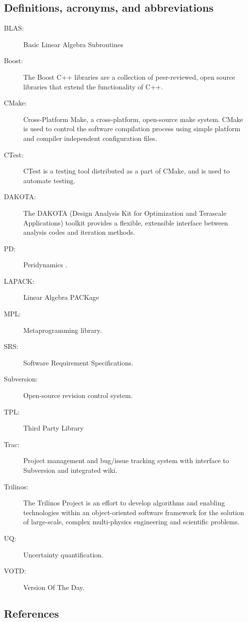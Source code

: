 \documentclass[10pt]{article}
\theoremstyle{plain}
\theoremstyle{definition}
\begin{document}
\subsection{Definitions, acronyms, and abbreviations}

\begin{description}
  \item[BLAS:] Basic Linear Algebra Subroutines
  \item[Boost:] The Boost C++ libraries are a collection of peer-reviewed, open source libraries that extend the functionality of C++.
  \item[CMake:] Cross-Platform Make, a cross-platform, open-source make system. CMake is used to control the software compilation process using simple platform and compiler independent configuration files.
  \item[CTest:] CTest is a testing tool distributed as a part of CMake, and is used to automate testing.
  \item[DAKOTA:] The DAKOTA (Design Analysis Kit for Optimization and Terascale Applications) toolkit \cite{Eldred:2008:Dakota} provides a flexible, extensible interface between analysis codes and iteration methods.
  \item[PD:] Peridynamics \cite{Silling:2000:PD,Silling:2005:Meshfree,Silling:2007:PDStates}.
  \item[LAPACK:] Linear Algebra PACKage
  \item[MPL:] Metaprogramming library.
  \item[SRS:] Software Requirement Specifications.
  \item[Subversion:] Open-source revision control system.
  \item[TPL:] Third Party Library
  \item[Trac:] Project management and bug/issue tracking system with interface to Subversion and integrated wiki.
  \item[Trilinos:] The Trilinos Project \cite{Heroux:2005:Trilinos} is an effort to develop algorithms and enabling technologies within an object-oriented software framework for the solution of large-scale, complex multi-physics engineering and scientific problems.
  \item[UQ:] Uncertainty quantification.
  \item[VOTD:] Version Of The Day.
\end{description}

\subsection{References}


\end{document}
